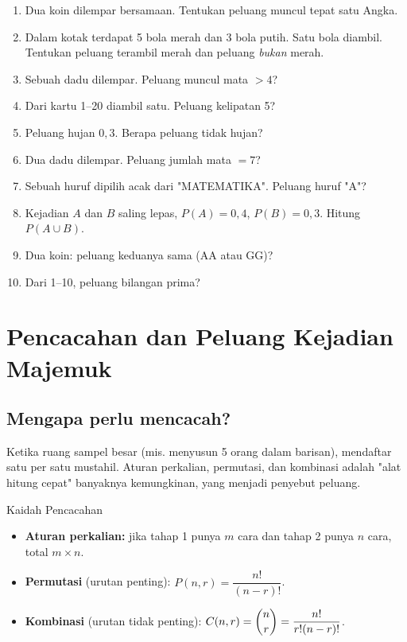 \documentclass[11pt,a4paper]{report}
\theoremstyle{gaya}
\begin{document}
\begin{latihan}
\begin{enumerate}[leftmargin=*]
  \item Dua koin dilempar bersamaan. Tentukan peluang muncul tepat satu Angka.
  \item Dalam kotak terdapat 5 bola merah dan 3 bola putih. Satu bola diambil. Tentukan peluang terambil merah dan peluang \emph{bukan} merah.
  \item Sebuah dadu dilempar. Peluang muncul mata $>4$?
  \item Dari kartu 1--20 diambil satu. Peluang kelipatan 5?
  \item Peluang hujan $0{,}3$. Berapa peluang tidak hujan?
  \item Dua dadu dilempar. Peluang jumlah mata $=7$?
  \item Sebuah huruf dipilih acak dari "MATEMATIKA". Peluang huruf "A"?
  \item Kejadian $A$ dan $B$ saling lepas, $P(A)=0{,}4$, $P(B)=0{,}3$. Hitung $P(A\cup B)$.
  \item Dua koin: peluang keduanya sama (AA atau GG)?
  \item Dari 1--10, peluang bilangan prima?
\end{enumerate}
\end{latihan}

\section{Pencacahan dan Peluang Kejadian Majemuk}

\subsection*{Mengapa perlu mencacah?}
Ketika ruang sampel besar (mis. menyusun 5 orang dalam barisan), mendaftar satu per satu mustahil. Aturan perkalian, permutasi, dan kombinasi adalah "alat hitung cepat" banyaknya kemungkinan, yang menjadi penyebut peluang.

\begin{konsep}{Kaidah Pencacahan}
\begin{itemize}[leftmargin=*,topsep=2pt]
  \item \textbf{Aturan perkalian:} jika tahap 1 punya $m$ cara dan tahap 2 punya $n$ cara, total $m\times n$.
  \item \textbf{Permutasi} (urutan penting): $P(n,r)=\dfrac{n!}{(n-r)!}$.
  \item \textbf{Kombinasi} (urutan tidak penting): $C(n,r)=\dbinom{n}{r}=\dfrac{n!}{r!(n-r)!}$.
\end{itemize}
\end{konsep}
\end{document}
